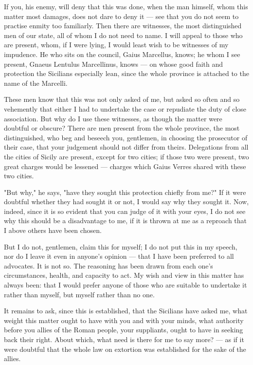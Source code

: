  If you, his enemy, will deny that this was done, when the man himself, whom this matter most damages, does not dare to deny it --- see that you do not seem to practise enmity too familiarly. Then there are witnesses, the most distinguished men of our state, all of whom I do not need to name. I will appeal to those who are present, whom, if I were lying, I would least wish to be witnesses of my impudence. He who sits on the council, Gaius Marcellus, knows; he whom I see present, Gnaeus Lentulus Marcellinus, knows --- on whose good faith and protection the Sicilians especially lean, since the whole province is attached to the name of the Marcelli.

 These men know that this was not only asked of me, but asked so often and so vehemently that either I had to undertake the case or repudiate the duty of close association. But why do I use these witnesses, as though the matter were doubtful or obscure? There are men present from the whole province, the most distinguished, who beg and beseech you, gentlemen, in choosing the prosecutor of their case, that your judgement should not differ from theirs. Delegations from all the cities of Sicily are present, except for two cities; if those two were present, two great charges would be lessened --- charges which Gaius Verres shared with these two cities.

 "But why," he says, "have they sought this protection chiefly from me?" If it were doubtful whether they had sought it or not, I would say why they sought it. Now, indeed, since it is so evident that you can judge of it with your eyes, I do not see why this should be a disadvantage to me, if it is thrown at me as a reproach that I above others have been chosen.

 But I do not, gentlemen, claim this for myself; I do not put this in my speech, nor do I leave it even in anyone's opinion --- that I have been preferred to all advocates. It is not so. The reasoning has been drawn from each one's circumstances, health, and capacity to act. My wish and view in this matter has always been: that I would prefer anyone of those who are suitable to undertake it rather than myself, but myself rather than no one.

 It remains to ask, since this is established, that the Sicilians have asked me, what weight this matter ought to have with you and with your minds, what authority before you allies of the Roman people, your suppliants, ought to have in seeking back their right. About which, what need is there for me to say more? --- as if it were doubtful that the whole law on extortion was established for the sake of the allies.

